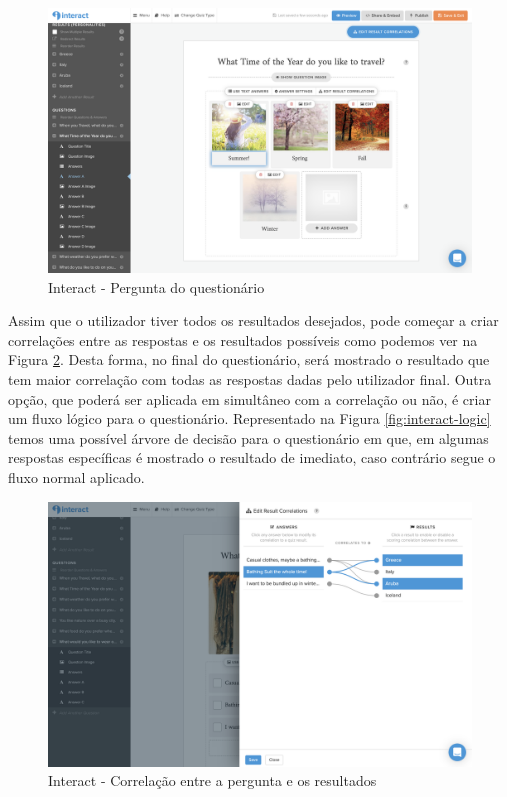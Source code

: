 \begin{figure}[ht!]
	\begin{center}
		\includegraphics[width=1\textwidth]{img/interact/quest}
		\caption{Interact - Pergunta do questionário}
		\label{fig:interact-quest}
	\end{center}
\end{figure}


Assim que o utilizador tiver todos os resultados desejados, pode começar a criar correlações entre as respostas e os resultados possíveis como podemos ver na Figura \ref{fig:interact-currelation}. Desta forma, no final do questionário, será mostrado o resultado que tem maior correlação com todas as respostas dadas pelo utilizador final. Outra opção, que poderá ser aplicada em simultâneo com a correlação ou não, é criar um fluxo lógico para o questionário. Representado na Figura \ref{fig:interact-logic} temos uma possível árvore de decisão para o questionário em que, em algumas respostas específicas é mostrado o resultado de imediato, caso contrário segue o fluxo normal aplicado.

\begin{figure}[ht!]
	\begin{center}
		\includegraphics[width=1\textwidth]{img/interact/currelation}
		\caption{Interact - Correlação entre a pergunta e os resultados}
		\label{fig:interact-currelation}
	\end{center}
\end{figure}

